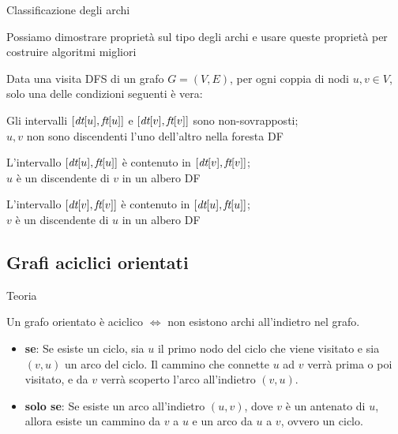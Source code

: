\begin{frame}{Classificazione degli archi}

\vspace{-6pt}
\begin{myboxtitle}
Possiamo dimostrare proprietà sul tipo degli archi e usare queste proprietà
per costruire algoritmi migliori
\end{myboxtitle}

\begin{myboxtitle}[Teorema]
Data una visita DFS di un grafo  $G=(V,E)$, per ogni coppia di nodi 
$u,v \in V$, solo una delle condizioni seguenti è vera:
\BI 
\item Gli intervalli $[\textit{dt}[u], \textit{ft}[u]]$ e $[\textit{dt}[v], \textit{ft}[v]]$ sono 
non-sovrapposti; \\
\alert{$u,v$ non sono discendenti l'uno dell'altro} nella foresta DF
\item L'intervallo $[\textit{dt}[u], \textit{ft}[u]]$ è contenuto in $[\textit{dt}[v], \textit{ft}[v]]$;\\
\alert{$u$ è un discendente di $v$} in un albero DF
\item L'intervallo $[\textit{dt}[v], \textit{ft}[v]]$ è contenuto in $[\textit{dt}[u], \textit{ft}[u]]$;\\
\alert{$v$ è un discendente di $u$} in un albero DF
\EI
\end{myboxtitle}

\end{frame}


\subsection{Grafi aciclici orientati}


\begin{frame}{Teoria}

\vspace{-6pt}
\begin{myboxtitle}[Teorema]
Un grafo orientato è aciclico $\Leftrightarrow$ non esistono archi all'indietro nel grafo.
\end{myboxtitle}

\begin{myboxtitle}[Dimostrazione]
\begin{itemize}
\item {\bf se}: Se
	esiste un ciclo, sia $u$ il primo nodo del ciclo che viene visitato e sia
	$(v,u)$ un arco del ciclo. Il cammino che connette $u$ ad $v$ verrà prima o
	poi visitato, e da $v$ verrà scoperto l'arco all'indietro $(v,u)$.
\item 
  {\bf solo se}: Se
esiste un arco all'indietro $(u,v)$, dove $v$ è un antenato di $u$, allora
esiste un cammino da $v$ a $u$ e un arco da $u$ a $v$, ovvero un ciclo.
\end{itemize}
\end{myboxtitle}

\end{frame}

